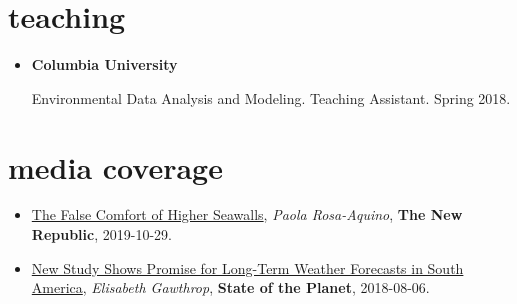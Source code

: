 \documentclass[10pt,oneside]{article}
\begin{document}

\section{\color{BrickRed}teaching}

\mbox{}\vspace{-\dimexpr\baselineskip\relax}


\begin{itemize}[label={}]
  
  \item \textbf{Columbia University}
        
        Environmental Data Analysis and Modeling. Teaching Assistant. Spring 2018.
        
        
\end{itemize}

%
%
%
%
%
%  
%        
%


\section{\color{BrickRed}media coverage}

\mbox{}\vspace{-\dimexpr\baselineskip\relax}

\begin{itemize}[label={}]
  
  \item \href{https://newrepublic.com/article/155519/false-comfort-higher-seawalls}{The False Comfort of Higher Seawalls}, \textit{Paola Rosa-Aquino}, \textbf{The New Republic}, 2019-10-29.
        
  \item \href{https://blogs.ei.columbia.edu/2018/08/06/subseasonal-weather-forecasts-paraguay/}{New Study Shows Promise for Long-Term Weather Forecasts in South America}, \textit{Elisabeth Gawthrop}, \textbf{State of the Planet}, 2018-08-06.
        
\end{itemize}
\end{document}
